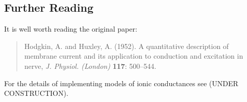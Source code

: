 \documentclass[12pt]{article}
\begin{document}
\subsection*{Further Reading}

It is well worth reading the original paper:

\begin{quote}
Hodgkin, A. and Huxley, A. (1952). A quantitative description of membrane current and its application to conduction and excitation in nerve, {\it J. Physiol. (London)} {\bf 117}: 500--544.
\end{quote}

For the details of implementing models of ionic conductances see (UNDER CONSTRUCTION). 
\end{document}
